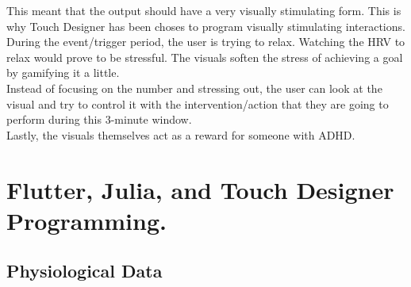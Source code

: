 \documentclass[
	fontsize=15pt,
	twoside=false,
	secnumdepth=2
]{kaobook}
\begin{document}
This meant that the output should have a very visually stimulating form. This is why Touch Designer has been choses to program visually stimulating interactions.  \\

During the event/trigger period, the user is trying to relax. Watching the HRV to relax would prove to be stressful. The visuals soften the stress of achieving a goal by gamifying it a little. \\

Instead of focusing on the number and stressing out, the user can look at the visual and try to control it with the intervention/action that they are going to perform during this 3-minute window. \\

Lastly, the visuals themselves act as a reward for someone with ADHD. \\


\chapter{Flutter, Julia, and Touch Designer Programming.}

\section{Physiological Data}
\end{document}
